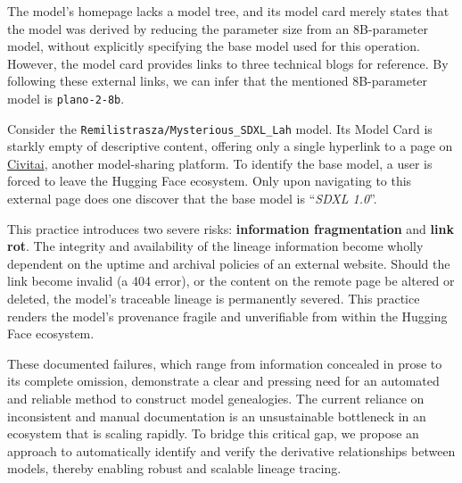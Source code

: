 \begin{tcolorbox}[
    title={\textbf{Case Study 3: \texttt{pfnet/plamo-2.1-2b-cpt}}},
    colback=gray!5!white, %
    colframe=gray!75!black, %
    fonttitle=\bfseries, %
    sharp corners %
]
The model's homepage lacks a model tree, and its model card merely states that the model was derived by reducing the parameter size from an 8B-parameter model, without explicitly specifying the base model used for this operation. However, the model card provides links to three technical blogs for reference. By following these external links, we can infer that the mentioned 8B-parameter model is \texttt{plano-2-8b}.

\end{tcolorbox}

\begin{tcolorbox}[
        title={\textbf{Case Study 4: \texttt{Remilistrasza/Mysterious\_SDXL\_Lah}}},
        colback=gray!5!white,
        colframe=gray!75!black,
        fonttitle=\bfseries,
        sharp corners
    ]
    Consider the \texttt{Remilistrasza/Mysterious\_SDXL\_Lah} model. Its Model Card is starkly empty of descriptive content, offering only a single hyperlink to a page on \href{https://civitai.com/}{Civitai}, another model-sharing platform. To identify the base model, a user is forced to leave the Hugging Face ecosystem. Only upon navigating to this external page does one discover that the base model is “\textit{SDXL 1.0}”.

\end{tcolorbox}

This practice introduces two severe risks: \textbf{information fragmentation} and \textbf{link rot}. The integrity and availability of the lineage information become wholly dependent on the uptime and archival policies of an external website. Should the link become invalid (a 404 error), or the content on the remote page be altered or deleted, the model's traceable lineage is permanently severed. This practice renders the model's provenance fragile and unverifiable from within the Hugging Face ecosystem.

These documented failures, which range from information concealed in prose to its complete omission, demonstrate a clear and pressing need for an automated and reliable method to construct model genealogies. The current reliance on inconsistent and manual documentation is an unsustainable bottleneck in an ecosystem that is scaling rapidly. To bridge this critical gap, we propose an approach to automatically identify and verify the derivative relationships between models, thereby enabling robust and scalable lineage tracing.
